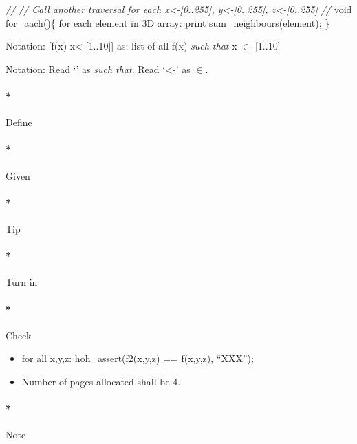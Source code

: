 \documentclass[]{article}
\newenvironment{Shaded}{}{}
\newcommand{\DataTypeTok}[1]{\textcolor[rgb]{0.50,0.00,0.00}{{#1}}}
\newcommand{\CommentTok}[1]{\textcolor[rgb]{0.50,0.50,0.50}{\textit{{#1}}}}
\newcommand{\ControlFlowTok}[1]{{#1}}
\newcommand{\NormalTok}[1]{{#1}}
\providecommand{\tightlist}{%
  \setlength{\itemsep}{0pt}\setlength{\parskip}{0pt}}
\let\oldparagraph\paragraph
\renewcommand{\paragraph}[1]{\oldparagraph{#1}\mbox{}}
\begin{document}
\begin{Shaded}
\begin{Highlighting}[]
        \CommentTok{//}
        \CommentTok{// Call another traversal for each x<-[0..255], y<-[0..255], z<-[0..255]}
        \CommentTok{//}
        \DataTypeTok{void} \NormalTok{for_aach()\{}
          \ControlFlowTok{for} \NormalTok{each element in 3D array: }
             \NormalTok{print sum_neighbours(element);}
        \NormalTok{\}}
\end{Highlighting}
\end{Shaded}

Notation: {[}f(x) \textbar{} x\textless{}-{[}1..10{]}{]} as: list of all
f(x) \emph{such that} x \(\in\) {[}1..10{]}

Notation: Read `\textbar{}' as \emph{such that}. Read `\textless{}-' as
\(\in\).

\paragraph*{Define}\label{define-13}

\paragraph*{Given}\label{given-13}

\paragraph*{Tip}\label{tip-13}

\paragraph*{Turn in}\label{turn-in-13}

\paragraph*{Check}\label{check-13}

\begin{itemize}
\tightlist
\item
  for all x,y,z: hoh\_assert(f2(x,y,z) == f(x,y,z), ``XXX'');
\item
  Number of pages allocated shall be 4.
\end{itemize}

\paragraph*{Note}\label{note-15}
\end{document}
